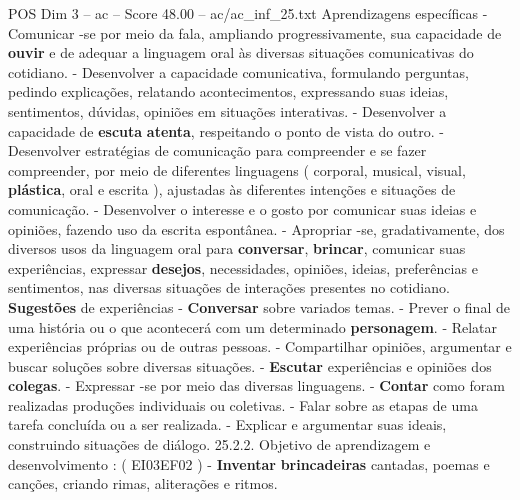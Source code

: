\begin{textsample}{POS Dim 3 – ac – Score 48.00 – ac/ac\_inf\_25.txt}
Aprendizagens específicas - Comunicar -se por meio da fala, ampliando progressivamente, sua capacidade de \textbf{ouvir} e de adequar a linguagem oral às diversas situações comunicativas do cotidiano. - Desenvolver a capacidade comunicativa, formulando perguntas, pedindo explicações, relatando acontecimentos, expressando suas ideias, sentimentos, dúvidas, opiniões em situações interativas. - Desenvolver a capacidade de \textbf{escuta} \textbf{atenta}, respeitando o ponto de vista do outro. - Desenvolver estratégias de comunicação para compreender e se fazer compreender, por meio de diferentes linguagens ( corporal, musical, visual, \textbf{plástica}, oral e escrita ), ajustadas às diferentes intenções e situações de comunicação. - Desenvolver o interesse e o gosto por comunicar suas ideias e opiniões, fazendo uso da escrita espontânea. - Apropriar -se, gradativamente, dos diversos usos da linguagem oral para \textbf{conversar}, \textbf{brincar}, comunicar suas experiências, expressar \textbf{desejos}, necessidades, opiniões, ideias, preferências e sentimentos, nas diversas situações de interações presentes no cotidiano. \textbf{Sugestões} de experiências - \textbf{Conversar} sobre variados temas. - Prever o final de uma história ou o que acontecerá com um determinado \textbf{personagem}. - Relatar experiências próprias ou de outras pessoas. - Compartilhar opiniões, argumentar e buscar soluções sobre diversas situações. - \textbf{Escutar} experiências e opiniões dos \textbf{colegas}. - Expressar -se por meio das diversas linguagens. - \textbf{Contar} como foram realizadas produções individuais ou coletivas. - Falar sobre as etapas de uma tarefa concluída ou a ser realizada. - Explicar e argumentar suas ideais, construindo situações de diálogo. 25.2.2.
Objetivo de aprendizagem e desenvolvimento : ( EI03EF02 ) - \textbf{Inventar} \textbf{brincadeiras} cantadas, poemas e canções, criando rimas, aliterações e ritmos.

\end{textsample}
